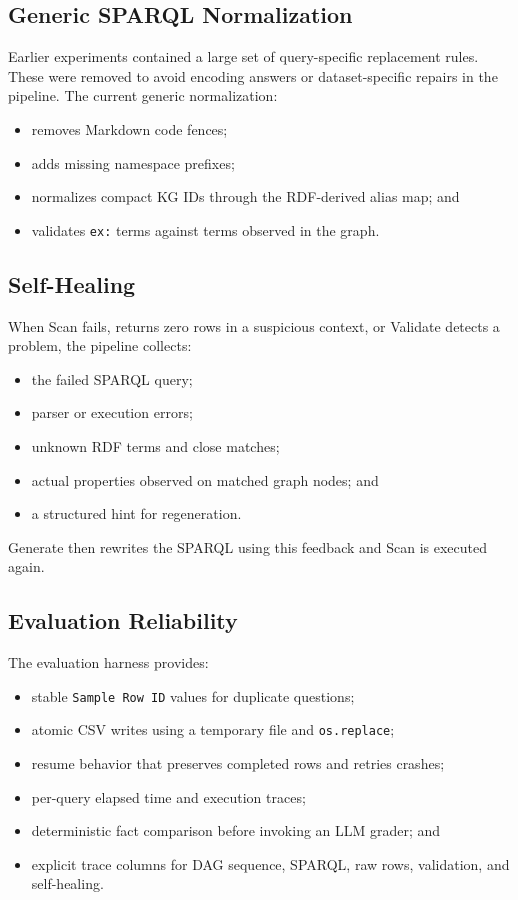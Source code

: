 \documentclass[11pt]{article}
\begin{document}
\subsection{Generic SPARQL Normalization}

Earlier experiments contained a large set of query-specific replacement rules. These were removed to avoid encoding answers or dataset-specific repairs in the pipeline. The current generic normalization:

\begin{itemize}[leftmargin=*]
    \item removes Markdown code fences;
    \item adds missing namespace prefixes;
    \item normalizes compact KG IDs through the RDF-derived alias map; and
    \item validates \texttt{ex:} terms against terms observed in the graph.
\end{itemize}

\subsection{Self-Healing}

When Scan fails, returns zero rows in a suspicious context, or Validate detects a problem, the pipeline collects:

\begin{itemize}[leftmargin=*]
    \item the failed SPARQL query;
    \item parser or execution errors;
    \item unknown RDF terms and close matches;
    \item actual properties observed on matched graph nodes; and
    \item a structured hint for regeneration.
\end{itemize}

Generate then rewrites the SPARQL using this feedback and Scan is executed again.

\subsection{Evaluation Reliability}

The evaluation harness provides:

\begin{itemize}[leftmargin=*]
    \item stable \texttt{Sample Row ID} values for duplicate questions;
    \item atomic CSV writes using a temporary file and \texttt{os.replace};
    \item resume behavior that preserves completed rows and retries crashes;
    \item per-query elapsed time and execution traces;
    \item deterministic fact comparison before invoking an LLM grader; and
    \item explicit trace columns for DAG sequence, SPARQL, raw rows, validation, and self-healing.
\end{itemize}
\end{document}
